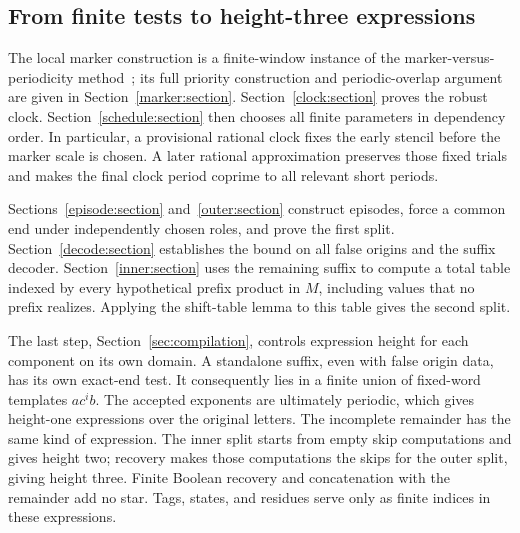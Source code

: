 \subsection{From finite tests to height-three expressions}

The local marker construction is a finite-window instance of the
marker-versus-periodicity method~\cite[Lemma~2]{Krieger1982}; its full
priority construction and periodic-overlap argument are given in
Section~\ref{marker:section}. Section~\ref{clock:section} proves the
robust clock. Section~\ref{schedule:section} then chooses all finite
parameters in dependency order. In particular, a provisional rational
clock fixes the early stencil before the marker scale is chosen. A later
rational approximation preserves those fixed trials and makes the final
clock period coprime to all relevant short periods.

Sections~\ref{episode:section} and~\ref{outer:section} construct episodes,
force a common end under independently chosen roles, and prove the first
split. Section~\ref{decode:section} establishes the bound on all false
origins and the suffix decoder. Section~\ref{inner:section} uses the
remaining suffix to compute a total table indexed by every hypothetical
prefix product in $M$, including values that no prefix realizes. Applying
the shift-table lemma to this table gives the second split.

The last step, Section~\ref{sec:compilation}, controls expression height
for each component on its own domain. A standalone suffix, even with
false origin data, has its own exact-end test. It consequently lies in a
finite union of fixed-word templates $ac^ib$. The accepted exponents are
ultimately periodic, which gives height-one expressions over the original
letters. The incomplete remainder has the same kind of expression. The
inner split starts from empty skip computations and gives height two;
recovery makes those computations the skips for the outer split, giving
height three. Finite Boolean recovery and concatenation with the
remainder add no star. Tags, states, and residues serve only as finite
indices in these expressions.

